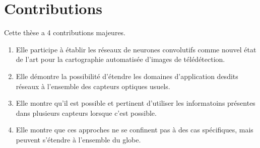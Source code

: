 \section{Contributions}

Cette thèse a 4 contributions majeures.
\begin{enumerate}
  \item Elle participe à établir les réseaux de neurones convolutifs comme nouvel état de l'art pour la cartographie automatisée d'images de télédétection.
  \item Elle démontre la possibilité d'étendre les domaines d'application desdits réseaux à l'ensemble des capteurs optiques usuels.
  \item Elle montre qu'il est possible et pertinent d'utiliser les informatoins présentes dans plusieurs capteurs lorsque c'est possible.
  \item Elle montre que ces approches ne se confinent pas à des cas spécifiques, mais peuvent s'étendre à l'ensemble du globe.
\end{enumerate}

%
%
